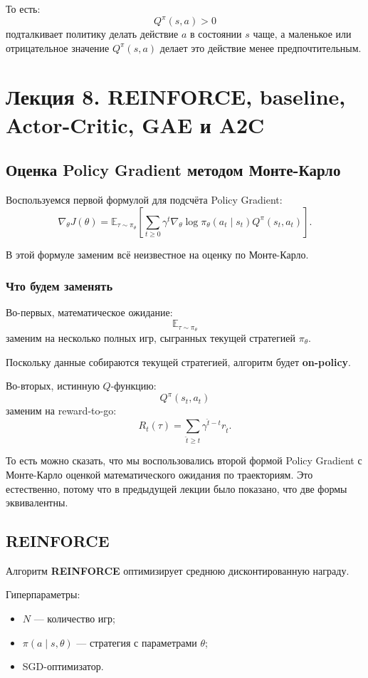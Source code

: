 \documentclass[12pt,a4paper]{article}
\begin{document}
То есть:
\[
Q^\pi(s,a)>0
\]
подталкивает политику делать действие $a$ в состоянии $s$ чаще, а маленькое или отрицательное значение $Q^\pi(s,a)$ делает это действие менее предпочтительным.




\section{Лекция 8. REINFORCE, baseline, Actor-Critic, GAE и A2C}

\subsection{Оценка Policy Gradient методом Монте-Карло}

Воспользуемся первой формулой для подсчёта Policy Gradient:
\[
\nabla_\theta J(\theta)
=
\mathbb E_{\tau\sim\pi_\theta}
\left[
\sum_{t\ge 0}
\gamma^t
\nabla_\theta
\log \pi_\theta(a_t\mid s_t)
Q^\pi(s_t,a_t)
\right].
\]

В этой формуле заменим всё неизвестное на оценку по Монте-Карло.

\subsubsection{Что будем заменять}

Во-первых, математическое ожидание:
\[
\mathbb E_{\tau\sim\pi_\theta}
\]
заменим на несколько полных игр, сыгранных текущей стратегией $\pi_\theta$.

Поскольку данные собираются текущей стратегией, алгоритм будет \textbf{on-policy}.

Во-вторых, истинную $Q$-функцию:
\[
Q^\pi(s_t,a_t)
\]
заменим на reward-to-go:
\[
R_t(\tau)
=
\sum_{\hat t\ge t}
\gamma^{\hat t-t}
r_{\hat t}.
\]

То есть можно сказать, что мы воспользовались второй формой Policy Gradient с Монте-Карло оценкой математического ожидания по траекториям. Это естественно, потому что в предыдущей лекции было показано, что две формы эквивалентны.

\subsection{REINFORCE}

Алгоритм \textbf{REINFORCE} оптимизирует среднюю дисконтированную награду.

Гиперпараметры:
\begin{itemize}
    \item $N$ --- количество игр;
    \item $\pi(a\mid s,\theta)$ --- стратегия с параметрами $\theta$;
    \item SGD-оптимизатор.
\end{itemize}
\end{document}
